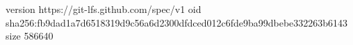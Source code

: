 version https://git-lfs.github.com/spec/v1
oid sha256:fb9dad1a7d6518319d9c56a6d2300dfdced012c6fde9ba99dbebe332263b6143
size 586640
